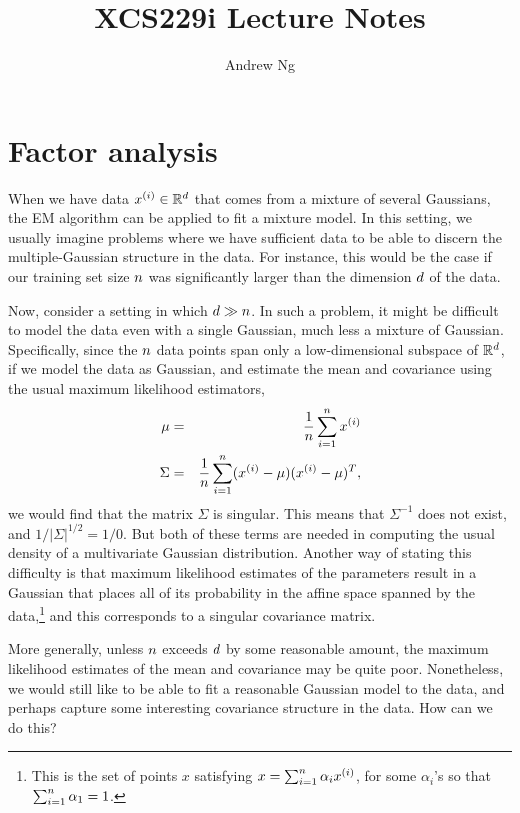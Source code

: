 \documentclass{article}
\begin{document}
\title{XCS229i Lecture Notes}
\author{Andrew Ng}
\date{}
\maketitle

\setcounter{part}{9}
\part{Factor analysis}

When we have data ${x^{(i)}}\in {\mathbb R}^{d}$ that comes from a mixture of several Gaussians,
the EM algorithm can be applied to fit a mixture model.  In this
setting, we usually imagine problems where we have sufficient data
to be able to discern the multiple-Gaussian structure in the data.  For instance,
this would be the case if our training set size ${n}$ was significantly
larger than the dimension ${d}$ of the data.

Now, consider a setting in which ${d} \gg {n}$.
In such a problem, it might be difficult to model
the data even with a single Gaussian, much less a mixture of Gaussian. Specifically,
since the ${n}$ data points span only a low-dimensional subspace of ${\mathbb R}^{d}$, if we model
the data as Gaussian, and estimate the mean and covariance using the usual
maximum likelihood estimators,
\begin{eqnarray*}
\mu &=& \frac{1}{{n}}\sum_{i=1}^{n} {x^{(i)}}  \\
\Sigma &=& \frac{1}{{n}}\sum_{i=1}^{n} ({x^{(i)}} -\mu) ({x^{(i)}} -\mu)^T,
\end{eqnarray*}
we would find that the matrix $\Sigma$ is singular.  This means that $\Sigma^{-1}$
does not exist, and $1/|\Sigma|^{1/2} = 1/0$. But both of these terms are needed
in computing the usual density of a multivariate Gaussian distribution.  Another way
of stating this difficulty is that maximum likelihood estimates of the parameters
result in a Gaussian that places all of its probability in the affine space spanned
by the data,\footnote{This is the set of points $x$ satisfying $x = \sum_{i=1}^{n} \alpha_i {x^{(i)}}$,
for some $\alpha_i$'s so that $\sum_{i=1}^{n} \alpha_1 = 1$.} and this corresponds to a singular
covariance matrix.

More generally, unless ${n}$ exceeds ${d}$ by some reasonable amount, the maximum likelihood
estimates of the mean and covariance may be quite poor.  Nonetheless, we would still like to
be able to fit a reasonable Gaussian model to the data, and perhaps capture some
interesting covariance structure in the data.  How can we do this?
\end{document}
